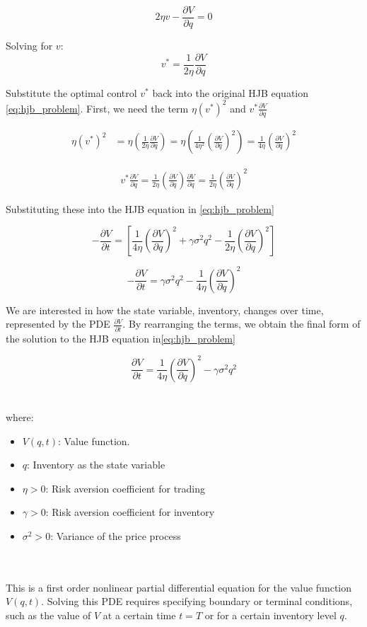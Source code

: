 {$$2 \eta v - \frac{\partial V}{\partial q} = 0$$

Solving for $v$:
\begin{equation}\label{eq:optimal_control_function}
v^* = \frac{1}{2 \eta} \frac{\partial V}{\partial q}
\end{equation}

Substitute the optimal control $v^*$ back into the original HJB equation \ref{eq:hjb_problem}. First, we need the term $\eta(v^*)^2$ and $v^*\frac{\partial V}{\partial q}$

\begin{align*}
\eta(v^*)^2 &= \eta\left( \frac{1}{2\eta} \frac{\partial V}{\partial q} \right)
= \eta \left( \frac{1}{4\eta^2} \left(\frac{\partial V}{\partial q}\right)^2 \right)
= \frac{1}{4\eta} \left(\frac{\partial V}{\partial q}\right)^2
\end{align*}

\begin{align*}
v^*\frac{\partial V}{\partial q} = \frac{1}{2\eta}\left(\frac{\partial V}{\partial q}\right)\frac{\partial V}{\partial q}
= \frac{1}{2\eta} \left(\frac{\partial V}{\partial q}\right)^2
\end{align*}

Substituting these into the HJB equation in \ref{eq:hjb_problem}

$$-\frac{\partial V}{\partial t} = \left[ \frac{1}{4 \eta} \left(\frac{\partial V}{\partial q}\right)^2 + \gamma \sigma^2 q^2 - \frac{1}{2 \eta} \left(\frac{\partial V}{\partial q}\right)^2 \right]$$

$$-\frac{\partial V}{\partial t} = \gamma \sigma^2 q^2 - \frac{1}{4 \eta} \left(\frac{\partial V}{\partial q}\right)^2$$

We are interested in how the state variable, inventory, changes over time, represented by the PDE $\frac{\partial V}{\partial t}$. By rearranging the terms, we obtain the final form of the solution to the HJB equation in\ref{eq:hjb_problem}

\begin{equation}\label{eq:derived_hjb}
\frac{\partial V}{\partial t} = \frac{1}{4 \eta} \left(\frac{\partial V}{\partial q}\right)^2 - \gamma \sigma^2 q^2
\end{equation}
\\\\
where:
\begin{itemize}
\item $V(q, t)$: Value function.
\item $q$: Inventory as the state variable
\item $\eta > 0$: Risk aversion coefficient for trading
\item $\gamma > 0$: Risk aversion coefficient for inventory
\item $\sigma^2 > 0$: Variance of the price process
\end{itemize}
\\\\
This is a first order nonlinear partial differential equation for the value function $V(q, t)$. Solving this PDE requires specifying boundary or terminal conditions, such as the value of $V$ at a certain time $t=T$ or for a certain inventory level $q$.

}
